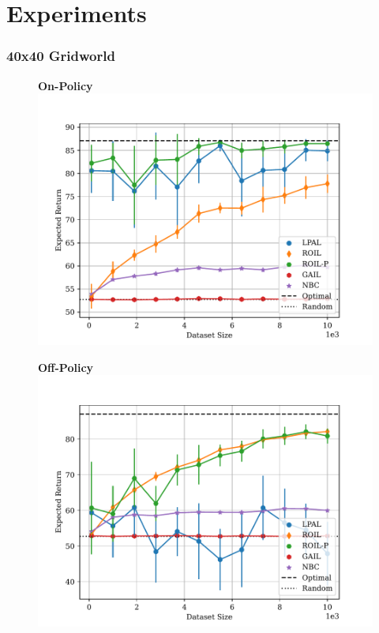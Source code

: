 \documentclass{beamer}
\begin{document}
\section*{Experiments}

\begin{frame}
\frametitle{40x40 Gridworld}
\begin{figure}
  \begin{center}
  \begin{minipage}{0.45\linewidth}
    \centering
    \textbf{On-Policy}
    \includegraphics[width=\linewidth]{../../pres_roil/plots/returns/40x40_gridworld_on_policy_returns.pdf}
  \end{minipage}
  \hspace{0.05\linewidth}
  \begin{minipage}{0.45\linewidth}
    \centering
    \textbf{Off-Policy}
    \includegraphics[width=\linewidth]{../../pres_roil/plots/returns/40x40_gridworld_off_policy_returns.pdf}
  \end{minipage}
  \end{center}
\end{figure}
\end{frame}
\end{document}
